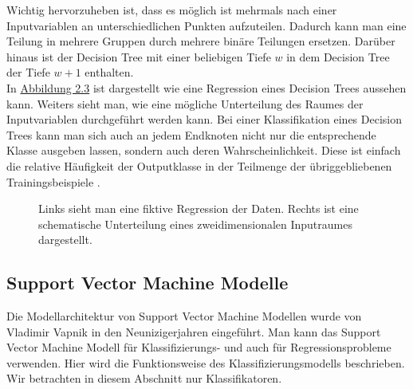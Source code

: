 Wichtig hervorzuheben ist, dass es m\"oglich ist mehrmals nach einer Inputvariablen an unterschiedlichen Punkten aufzuteilen. 
Dadurch kann man eine Teilung in mehrere Gruppen durch mehrere bin\"are Teilungen ersetzen.
Dar\"uber hinaus ist der Decision Tree mit einer beliebigen Tiefe $w$ in dem Decision Tree der Tiefe $w + 1$ enthalten. \\



In \hyperref[fig:rf2]{Abbildung 2.3} ist dargestellt wie eine Regression eines Decision Trees aussehen kann. Weiters sieht man, wie eine m\"ogliche Unterteilung des 
Raumes der Inputvariablen durchgef\"uhrt werden kann. Bei einer Klassifikation eines Decision Trees kann man sich auch an jedem Endknoten nicht nur die entsprechende Klasse 
ausgeben lassen, sondern auch deren Wahrscheinlichkeit. Diese ist einfach die relative H\"aufigkeit der Outputklasse in der Teilmenge der \"ubriggebliebenen Trainingsbeispiele \cite{sklearn}.  \\ 

\begin{figure}[ht]
  \label{fig:rf2}
  \begin{center}
    \begin{tiny}
    \end{tiny}
  \end{center}
  \caption[Regression eines Random Forest Modells]
    {Links sieht man eine fiktive Regression der Daten. Rechts ist eine schematische Unterteilung eines zweidimensionalen Inputraumes dargestellt.}
\end{figure}





























\subsection{Support Vector Machine Modelle}

Die Modellarchitektur von Support Vector Machine Modellen wurde von Vladimir Vapnik \cite{SVMVapnik} in den Neunizigerjahren eingef\"uhrt. Man kann das 
Support Vector Machine Modell f\"ur Klassifizierungs- und auch f\"ur Regressionsprobleme verwenden. Hier wird die Funktionsweise des Klassifizierungsmodells
beschrieben. Wir betrachten in diesem Abschnitt nur Klassifikatoren. \\

